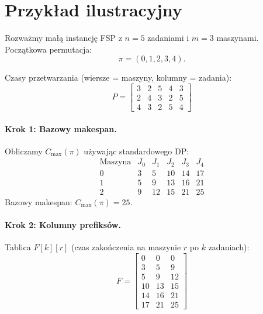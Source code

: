 \section{Przykład ilustracyjny}

Rozważmy małą instancję FSP z $n=5$ zadaniami i $m=3$ maszynami. Początkowa permutacja:
\begin{equation}\label{permutation}
\pi = (0, 1, 2, 3, 4).
\end{equation}

Czasy przetwarzania (wiersze = maszyny, kolumny = zadania):
\begin{equation}\label{eq_P_matrix}
P = \begin{bmatrix}
3 & 2 & 5 & 4 & 3 \\
2 & 4 & 3 & 2 & 5 \\
4 & 3 & 2 & 5 & 4
\end{bmatrix}
\end{equation}

\paragraph{Krok 1: Bazowy makespan.}

Obliczamy $C_{\max}(\pi)$ używając standardowego DP:
\begin{equation}\label{eq_cmachnies_jobs}
\begin{array}{c|ccccc}
\text{Maszyna} & J_0 & J_1 & J_2 & J_3 & J_4 \\
\hline
0 & 3 & 5 & 10 & 14 & 17 \\
1 & 5 & 9 & 13 & 16 & 21 \\
2 & 9 & 12 & 15 & 21 & 25
\end{array}
\end{equation}
Bazowy makespan: $C_{\max}(\pi) = 25$.

\paragraph{Krok 2: Kolumny prefiksów.}

Tablica $F[k][r]$ (czas zakończenia na maszynie $r$ po $k$ zadaniach):
\begin{equation}\label{eq_F_matrix}
F = \begin{bmatrix}
0 & 0 & 0 \\
3 & 5 & 9 \\
5 & 9 & 12 \\
10 & 13 & 15 \\
14 & 16 & 21 \\
17 & 21 & 25
\end{bmatrix}
\end{equation}

